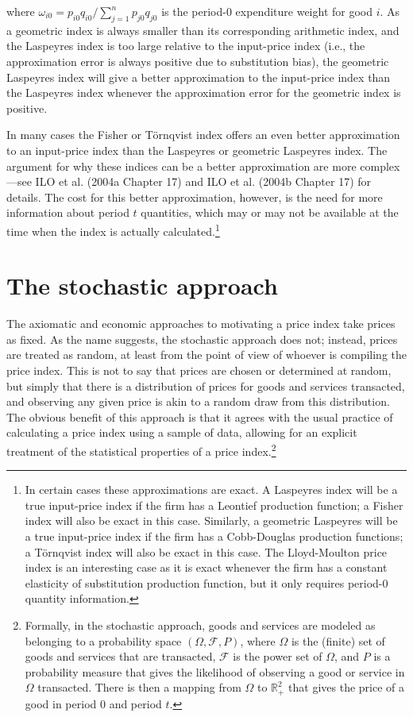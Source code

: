 \documentclass[]{article}
\begin{document}
where \(\omega_{i0} = p_{i0} q_{i0} / \sum_{j = 1}^{n} p_{j0} q_{j0}\) is the period-0 expenditure weight for good \(i\). As a geometric index is always smaller than its corresponding arithmetic index, and the Laspeyres index is too large relative to the input-price index (i.e., the approximation error is always positive due to substitution bias), the geometric Laspeyres index will give a better approximation to the input-price index than the Laspeyres index whenever the approximation error for the geometric index is positive.

In many cases the Fisher or Törnqvist index offers an even better approximation to an input-price index than the Laspeyres or geometric Laspeyres index. The argument for why these indices can be a better approximation are more complex---see ILO et al. (2004a Chapter 17) and ILO et al. (2004b Chapter 17) for details. The cost for this better approximation, however, is the need for more information about period \(t\) quantities, which may or may not be available at the time when the index is actually calculated.\footnote{In certain cases these approximations are exact. A Laspeyres index will be a true input-price index if the firm has a Leontief production function; a Fisher index will also be exact in this case. Similarly, a geometric Laspeyres will be a true input-price index if the firm has a Cobb-Douglas production functions; a Törnqvist index will also be exact in this case. The Lloyd-Moulton price index is an interesting case as it is exact whenever the firm has a constant elasticity of substitution production function, but it only requires period-0 quantity information.}

\hypertarget{the-stochastic-approach}{%
\section{The stochastic approach}\label{the-stochastic-approach}}

The axiomatic and economic approaches to motivating a price index take prices as fixed. As the name suggests, the stochastic approach does not; instead, prices are treated as random, at least from the point of view of whoever is compiling the price index. This is not to say that prices are chosen or determined at random, but simply that there is a distribution of prices for goods and services transacted, and observing any given price is akin to a random draw from this distribution. The obvious benefit of this approach is that it agrees with the usual practice of calculating a price index using a sample of data, allowing for an explicit treatment of the statistical properties of a price index.\footnote{Formally, in the stochastic approach, goods and services are modeled as belonging to a probability space \((\Omega, \mathcal{F}, P)\), where \(\Omega\) is the (finite) set of goods and services that are transacted, \(\mathcal{F}\) is the power set of \(\Omega\), and \(P\) is a probability measure that gives the likelihood of observing a good or service in \(\Omega\) transacted. There is then a mapping from \(\Omega\) to \(\mathbb{R}_{+}^{2}\) that gives the price of a good in period 0 and period \(t\).}
\end{document}
